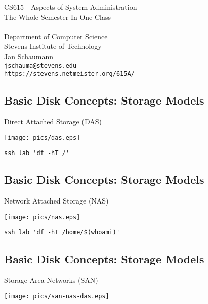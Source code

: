 \documentclass[xga]{xdvislides}
\begin{document}
\setfontphv

\lhead{\slidetitle}				%
\cfoot{\relax}					%
\rfoot{\Gray{\today}}

\vspace*{\fill}
\begin{center}
	\Hugesize
		CS615 - Aspects of System Administration\\ [1em]
		The Whole Semester In One Class\\ [1em]
	\hspace*{5mm}\blueline\\ [1em]
	\Normalsize
		Department of Computer Science\\
		Stevens Institute of Technology\\
		Jan Schaumann\\
		\verb+jschauma@stevens.edu+ \\
		\verb+https://stevens.netmeister.org/615A/+
\end{center}
\vspace*{\fill}

\subsection{Basic Disk Concepts: Storage Models}
Direct Attached Storage (DAS)
\vfill
\begin{center}
	\texttt{[image: pics/das.eps]} \\
\end{center}
\verb+ssh lab 'df -hT /'+
\vfill

\subsection{Basic Disk Concepts: Storage Models}
Network Attached Storage (NAS)
\vfill
\begin{center}
	\texttt{[image: pics/nas.eps]} \\
\end{center}
\verb+ssh lab 'df -hT /home/$(whoami)'+
\vfill

\subsection{Basic Disk Concepts: Storage Models}
Storage Area Networks (SAN)
\vfill
\begin{center}
	\texttt{[image: pics/san-nas-das.eps]} \\
\end{center}
\vfill
\end{document}

